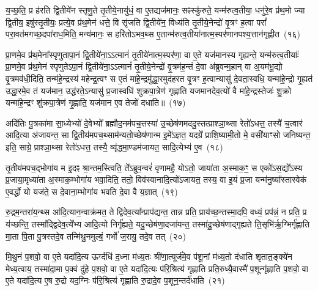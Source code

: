 य॒च्छ॒ति॒ प्र ह॑रति द्वि॒तीये॑न स्तृणु॒ते तृ॒तीये॒नायु॑धं॒ वा ए॒तद्यज॑मानः॒ सꣴस्कु॑रुते॒ यन्म॑रुत्व॒तीया॒ धनु॑रे॒व प्र॑थ॒मो ज्या द्वि॒तीय॒ इषु॑स्तृ॒तीयः॒ प्रत्ये॒व प्र॑थ॒मेन॑ धत्ते॒ वि सृ॑जति द्वि॒तीये॑न॒ विध्य॑ति तृ॒तीये॒नेन्द्रो॑ वृ॒त्रꣳ ह॒त्वा परां᳚ परा॒वत॑मगच्छ॒दपा॑राध॒मिति॒ मन्य॑मानः॒ स हरि॑तो\-ऽभव॒थ्स ए॒तान्म॑रुत्व॒तीया॑नात्म॒स्पर॑णानपश्य॒त्तान॑गृह्णीत~(१६)

प्रा॒णमे॒व प्र॑थ॒मेना᳚स्पृणुतापा॒नं द्वि॒तीये॑ना॒\-ऽऽ\-त्मानं॑ तृ॒तीये॑नात्म॒स्पर॑णा॒ वा ए॒ते यज॑मानस्य गृह्यन्ते॒ यन्म॑रुत्व॒तीयाः᳚ प्रा॒णमे॒व प्र॑थ॒मेन॑ स्पृणुते\-ऽपा॒नं द्वि॒तीये॑ना॒\-ऽऽ\-त्मानं॑ तृ॒तीये॒नेन्द्रो॑ वृ॒त्रम॑ह॒न्तं दे॒वा अ॑ब्रुवन्म॒हान् वा अ॒यम॑भू॒द्यो वृ॒त्रमव॑धी॒दिति॒ तन्म॑हे॒न्द्रस्य॑ महेन्द्र॒त्वꣳ स ए॒तं मा॑हे॒न्द्रमु॑द्धा॒रमुद॑हरत वृ॒त्रꣳ ह॒त्वान्यासु॑ दे॒वता॒स्वधि॒ यन्मा॑हे॒न्द्रो गृ॒ह्यत॑ उद्धा॒रमे॒व तं यज॑मान॒ उद्ध॑रते॒\-ऽन्यासु॑ प्र॒जास्वधि॑ शुक्रपा॒त्रेण॑ गृह्णाति यजमानदेव॒त्यो॑ वै मा॑हे॒न्द्रस्तेजः॑ शु॒क्रो यन्मा॑हे॒न्द्रꣳ शु॑क्रपा॒त्रेण॑ गृ॒ह्णाति॒ यज॑मान ए॒व तेजो॑ दधाति॥~(१७)

{\anuvakamend[{प्र॒थ॒मेना॑गृह्णीत दे॒वता᳚स्व॒ष्टाविꣳ॑शतिश्च}]}%

अदि॑तिः पु॒त्रका॑मा सा॒ध्येभ्यो॑ दे॒वेभ्यो᳚ ब्रह्मौद॒नम॑पच॒त्तस्या॑ उ॒च्छेष॑णमददु॒स्तत्प्राश्ञा॒थ्सा रेतो॑\-ऽधत्त॒ तस्यै॑ च॒त्वार॑ आदि॒त्या अ॑जायन्त॒ सा द्वि॒तीय॑मपच॒थ्साम॑न्यतो॒च्छेष॑णान्म इ॒मे᳚\-ऽज्ञत॒ यदग्रे᳚ प्राशि॒ष्यामी॒तो मे॒ वसी॑याꣳसो जनिष्यन्त॒ इति॒ साग्रे॒ प्राश्ञा॒थ्सा रेतो॑\-ऽधत्त॒ तस्यै॒ व्यृ॑द्धमा॒ण्डम॑जायत॒ सादि॒त्येभ्य॑ ए॒व~(१८)

तृ॒तीय॑मपच॒द्भोगा॑य म इ॒दꣴ श्रा॒न्तम॒स्त्विति॒ ते᳚\-ऽब्रुव॒न्वरं॑ वृणामहै॒ यो\-ऽतो॒ जाया॑ता अ॒स्माक॒ꣳ॒ स एको॑\-ऽस॒द्यो᳚\-ऽस्य प्र॒जाया॒मृध्या॑ता अ॒स्माक॒म्भोगा॑य भवा॒दिति॒ ततो॒ विव॑स्वानादि॒त्यो॑\-ऽजायत॒ तस्य॒ वा इ॒यं प्र॒जा यन्म॑नु॒ष्या᳚स्तास्वेक॑ ए॒वर्द्धो यो यज॑ते॒ स दे॒वाना॒म्भोगा॑य भवति दे॒वा वै य॒ज्ञात्~(१९)

रु॒द्रम॒न्तरा॑य॒न्थ्स आ॑दि॒त्यान॒न्वाक्र॑मत॒ ते द्वि॑देव॒त्या᳚न्प्राप॑द्यन्त॒ तान्न प्रति॒ प्राय॑च्छ॒न्तस्मा॒दपि॒ वध्यं॒ प्रप॑न्नं॒ न प्रति॒ प्र य॑च्छन्ति॒ तस्मा᳚द्द्विदेव॒त्ये᳚भ्य आदि॒त्यो निर्गृ॑ह्यते॒ यदु॒च्छेष॑णा॒दजा॑यन्त॒ तस्मा॑दु॒च्छेष॑णाद्गृह्यते ति॒सृभि॑र्\mbox{}ऋ॒ग्भिर्गृ॑ह्णाति मा॒ता पि॒ता पु॒त्रस्तदे॒व तन्मि॑थु॒नमुल्बं॒ गर्भो॑ ज॒रायु॒ तदे॒व तत्~(२०)

मि॒थु॒नं प॒शवो॒ वा ए॒ते यदा॑दि॒त्य ऊर्ग्दधि॑ द॒ध्ना म॑ध्य॒तः श्री॑णा॒त्यूर्ज॑मे॒व प॑शू॒नां म॑ध्य॒तो द॑धाति शृतात॒ङ्क्ये॑न मेध्य॒त्वाय॒ तस्मा॑दा॒मा प॒क्वं दु॑हे प॒शवो॒ वा ए॒ते यदा॑दि॒त्यः प॑रि॒श्रित्य॑ गृह्णाति प्रति॒रुध्यै॒वास्मै॑ प॒शून्गृ॑ह्णाति प॒शवो॒ वा ए॒ते यदा॑दि॒त्य ए॒ष रु॒द्रो यद॒ग्निः प॑रि॒श्रित्य॑ गृह्णाति रु॒द्रादे॒व प॒शून॒न्तर्द॑धाति~(२१)

